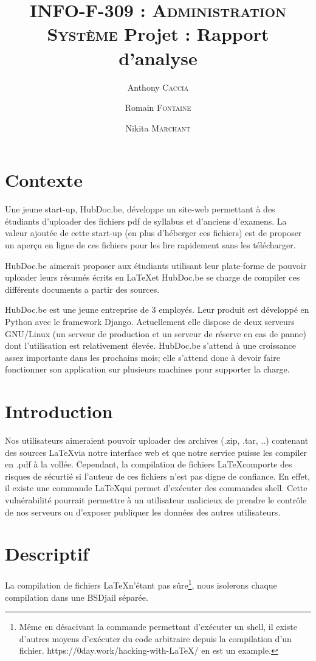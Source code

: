 \documentclass[10pt,a4paper]{article}
\author{Anthony \textsc{Caccia} \and Romain \textsc{Fontaine} \and Nikita \textsc{Marchant} }
\date{}
\title{\textsc{INFO-F-309 : Administration Système} Projet : Rapport d'analyse}
\begin{document}
\maketitle

\section{Contexte}

Une jeune start-up, HubDoc.be, développe un site-web permettant à des étudiants d'uploader des fichiers pdf de syllabus et d'anciens d'examens.
La valeur ajoutée de cette start-up (en plus d'héberger ces fichiers) est de proposer un aperçu en ligne de ces fichiers pour les lire rapidement sans les télécharger.

HubDoc.be aimerait proposer aux étudiants utilisant leur plate-forme de pouvoir uploader leurs résumés écrits en \LaTeX et HubDoc.be se charge de compiler ces différents documents a partir des sources.

HubDoc.be est une jeune entreprise de 3 employés.
Leur produit est développé en Python avec le framework Django.
Actuellement elle dispose de deux serveurs GNU/Linux (un serveur de production et un serveur de réserve en cas de panne) dont l'utilisation est relativement élevée.
HubDoc.be s'attend à une croissance assez importante dans les prochains mois;
elle s'attend donc à devoir faire fonctionner son application sur plusieurs machines pour supporter la charge.


\section{Introduction}

Nos utilisateurs aimeraient pouvoir uploader des archives (.zip, .tar, ..) contenant des sources \LaTeX via notre interface web et que notre service puisse les compiler en .pdf à la vollée.
Cependant, la compilation de fichiers \LaTeX comporte des risques de sécurtié si l'auteur de ces fichiers n'est pas digne de confiance.
En effet, il existe une commande \LaTeX qui permet d'exécuter des commandes shell.
Cette vulnérabilité pourrait permettre à un utilisateur malicieux de prendre le contrôle de nos serveurs ou d'exposer publiquer les données des autres utilisateurs.

\section{Descriptif}

La compilation de fichiers \LaTeX n'étant pas sûre\footnote{Même en désacivant la commande permettant d'exécuter un shell, il existe d'autres moyens d'exécuter du code arbitraire depuis la compilation d'un fichier. https://0day.work/hacking-with-LaTeX/ en est un example.}, nous isolerons chaque compilation dans une BSDjail séparée.
\end{document}
